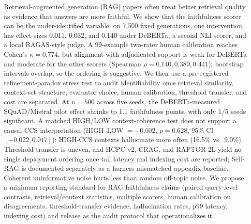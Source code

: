 Retrieval-augmented generation (RAG) papers often treat better retrieval
quality as evidence that answers are more faithful. We show that the
faithfulness scorer can be the under-identified variable: on 7,500 fixed
generations, one intervention has effect sizes 0.011, 0.032, and 0.140 under
DeBERTa, a second NLI scorer, and a local RAGAS-style judge. A 99-example
two-rater human calibration reaches Cohen's \(\kappa=0.774\), but alignment
with adjudicated support is weak for DeBERTa and moderate for the other
scorers (Spearman \(\rho=0.140,0.380,0.441\)); bootstrap intervals overlap, so
the ordering is suggestive. We then use a pre-registered refinement-paradox
stress test to audit identifiability once retrieval similarity, context-set
structure, evaluator choice, human calibration, threshold transfer, and cost
are separated. At \(n=500\) across five seeds, the DeBERTa-measured
SQuAD/Mistral pilot effect shrinks to 1.1 faithfulness points, with only 1/5
seeds significant. A matched HIGH/LOW context-coherence test does not support
a causal CCS interpretation (HIGH--LOW \(=-0.002\), \(p=0.628\), 95\% CI
\([-0.022,0.017]\)); HIGH-CCS contexts hallucinate more often (16.5\% vs.\
9.0\%). Threshold transfer is uneven, and HCPC-v2, CRAG, and RAPTOR-2L yield
no single deployment ordering once tail latency and indexing cost are
reported; Self-RAG is documented separately as a harness-mismatched appendix
baseline. Coherent uninformative noise hurts less than random off-topic noise.
We propose a minimum reporting standard for RAG faithfulness claims (paired
query-level contrasts, retrieval/context statistics, multiple scorers, human
calibration on disagreements, threshold-transfer evidence, hallucination
rates, p99 latency, indexing cost) and release \method{} as the audit protocol
that operationalizes it.
